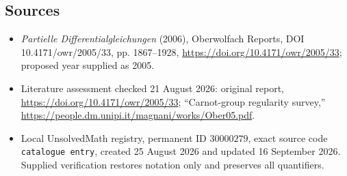 \documentclass[11pt]{article}
\begin{document}
\subsection{Sources}
\begin{itemize}
\item \emph{Partielle Differentialgleichungen} (2006), Oberwolfach Reports, DOI 10.4171/owr/2005/33, pp. 1867--1928, \url{https://doi.org/10.4171/owr/2005/33}; proposed year supplied as 2005.
\item Literature assessment checked 21 August 2026: original report, \url{https://doi.org/10.4171/owr/2005/33}; ``Carnot-group regularity survey,'' \url{https://people.dm.unipi.it/magnani/works/Ober05.pdf}.
\item Local UnsolvedMath registry, permanent ID $30000279$, exact source code \texttt{catalogue entry}, created 25 August 2026 and updated 16 September 2026. Supplied verification restores notation only and preserves all quantifiers.
\end{itemize}
\end{document}
